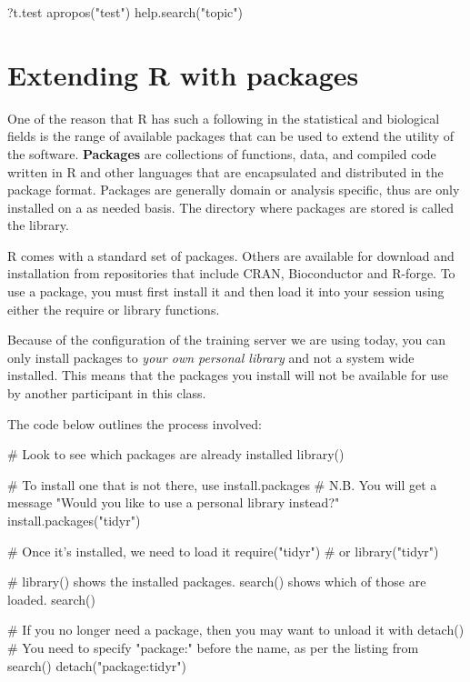 \documentclass[a4paper]{book}
\newenvironment{Shaded}{}{}
\newcommand{\KeywordTok}[1]{\textcolor[rgb]{0.00,0.00,1.00}{{#1}}}
\newcommand{\StringTok}[1]{\textcolor[rgb]{0.00,0.50,0.50}{{#1}}}
\newcommand{\CommentTok}[1]{\textcolor[rgb]{0.00,0.50,0.00}{{#1}}}
\newcommand{\NormalTok}[1]{{#1}}
\newlength{\leftbarwidth}
\newlength{\leftbarsep}
\newcommand*{\leftbarcolorcmd}{\color{darkgray}}%
\renewenvironment{leftbar}{%
    \def\FrameCommand{{\leftbarcolorcmd{\vrule width \leftbarwidth\relax\hspace {\leftbarsep}}}}%
    \MakeFramed {\advance \hsize -\width \FrameRestore }%
}{%
    \endMakeFramed
}
\renewenvironment{Shaded}
{\vspace{0em}\begin{leftbar}\begin{snugshade}}
{\end{snugshade}\end{leftbar}\vspace{0pt}}
\begin{document}
\begin{Shaded}
\begin{Highlighting}[]
\NormalTok{?t.test}
\KeywordTok{apropos}\NormalTok{(}\StringTok{"test"}\NormalTok{)}
\KeywordTok{help.search}\NormalTok{(}\StringTok{"topic"}\NormalTok{)}
\end{Highlighting}
\end{Shaded}

\section{Extending R with packages}\label{extending-r-with-packages}

One of the reason that R has such a following in the statistical and
biological fields is the range of available packages that can be used to
extend the utility of the software. \textbf{Packages} are collections of
functions, data, and compiled code written in R and other languages that
are encapsulated and distributed in the package format. Packages are
generally domain or analysis specific, thus are only installed on a as
needed basis. The directory where packages are stored is called the
library.

R comes with a standard set of packages. Others are available for
download and installation from repositories that include CRAN,
Bioconductor and R-forge. To use a package, you must first install it
and then load it into your session using either the require or library
functions.

Because of the configuration of the training server we are using today,
you can only install packages to \emph{your own personal library} and
not a system wide installed. This means that the packages you install
will not be available for use by another participant in this class.

The code below outlines the process involved:

\begin{Shaded}
\begin{Highlighting}[]
\CommentTok{# Look to see which packages are already installed}
\KeywordTok{library}\NormalTok{()}

\CommentTok{# To install one that is not there, use install.packages}
\CommentTok{# N.B. You will get a message "Would you like to use a personal library instead?"}
\KeywordTok{install.packages}\NormalTok{(}\StringTok{"tidyr"}\NormalTok{)}

\CommentTok{# Once it's installed, we need to load it}
\KeywordTok{require}\NormalTok{(}\StringTok{"tidyr"}\NormalTok{)}
\CommentTok{# or}
\KeywordTok{library}\NormalTok{(}\StringTok{"tidyr"}\NormalTok{)}

\CommentTok{# library() shows the installed packages. search() shows which of those are loaded.}
\KeywordTok{search}\NormalTok{()}

\CommentTok{# If you no longer need a package, then you may want to unload it with detach()}
\CommentTok{# You need to specify "package:" before the name, as per the listing from search()}
\KeywordTok{detach}\NormalTok{(}\StringTok{"package:tidyr"}\NormalTok{)}
\end{Highlighting}
\end{Shaded}
\end{document}
